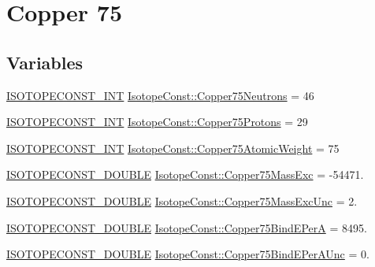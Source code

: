 \hypertarget{group___isotope_const-_copper-_cu75}{}\section{Copper 75}
\label{group___isotope_const-_copper-_cu75}
\subsection*{Variables}
\begin{DoxyCompactItemize}
\item 
\mbox{\hyperlink{group___isotope_const-_macros_ga5f18360b3e99483a35c32d789e62621c}{I\+S\+O\+T\+O\+P\+E\+C\+O\+N\+S\+T\+\_\+\+I\+NT}} \mbox{\hyperlink{group___isotope_const-_copper-_cu75_ga5d2cdd30c1691313f8e5e6894b5fce82}{Isotope\+Const\+::\+Copper75\+Neutrons}} = 46
\item 
\mbox{\hyperlink{group___isotope_const-_macros_ga5f18360b3e99483a35c32d789e62621c}{I\+S\+O\+T\+O\+P\+E\+C\+O\+N\+S\+T\+\_\+\+I\+NT}} \mbox{\hyperlink{group___isotope_const-_copper-_cu75_ga4a5a3e6ae81d81acea8a3df5a5ba2880}{Isotope\+Const\+::\+Copper75\+Protons}} = 29
\item 
\mbox{\hyperlink{group___isotope_const-_macros_ga5f18360b3e99483a35c32d789e62621c}{I\+S\+O\+T\+O\+P\+E\+C\+O\+N\+S\+T\+\_\+\+I\+NT}} \mbox{\hyperlink{group___isotope_const-_copper-_cu75_gaeab09f705c786c7ae6fb07518438ee46}{Isotope\+Const\+::\+Copper75\+Atomic\+Weight}} = 75
\item 
\mbox{\hyperlink{group___isotope_const-_macros_ga8f45a7272ce02c0b4c65c44636ed719a}{I\+S\+O\+T\+O\+P\+E\+C\+O\+N\+S\+T\+\_\+\+D\+O\+U\+B\+LE}} \mbox{\hyperlink{group___isotope_const-_copper-_cu75_ga36022fb786042b412fc9b865a4fa6c2e}{Isotope\+Const\+::\+Copper75\+Mass\+Exc}} = -\/54471.
\item 
\mbox{\hyperlink{group___isotope_const-_macros_ga8f45a7272ce02c0b4c65c44636ed719a}{I\+S\+O\+T\+O\+P\+E\+C\+O\+N\+S\+T\+\_\+\+D\+O\+U\+B\+LE}} \mbox{\hyperlink{group___isotope_const-_copper-_cu75_ga756ef7b32b33faa5d81aafbe9aa9df7c}{Isotope\+Const\+::\+Copper75\+Mass\+Exc\+Unc}} = 2.
\item 
\mbox{\hyperlink{group___isotope_const-_macros_ga8f45a7272ce02c0b4c65c44636ed719a}{I\+S\+O\+T\+O\+P\+E\+C\+O\+N\+S\+T\+\_\+\+D\+O\+U\+B\+LE}} \mbox{\hyperlink{group___isotope_const-_copper-_cu75_gaf43e7e5d8b627af7865b7ceadab69fd1}{Isotope\+Const\+::\+Copper75\+Bind\+E\+PerA}} = 8495.
\item 
\mbox{\hyperlink{group___isotope_const-_macros_ga8f45a7272ce02c0b4c65c44636ed719a}{I\+S\+O\+T\+O\+P\+E\+C\+O\+N\+S\+T\+\_\+\+D\+O\+U\+B\+LE}} \mbox{\hyperlink{group___isotope_const-_copper-_cu75_ga7a42ec1d51b917874dedbc6690854c15}{Isotope\+Const\+::\+Copper75\+Bind\+E\+Per\+A\+Unc}} = 0.

\end{DoxyCompactItemize}
